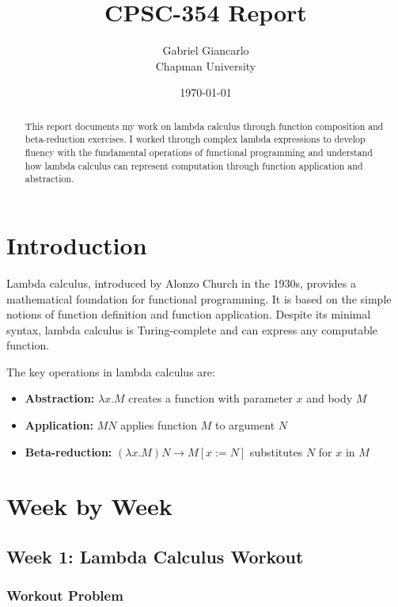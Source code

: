 \documentclass{article}
\title{CPSC-354 Report}
\author{Gabriel Giancarlo \\ Chapman University}
\date{\today}
\theoremstyle{plain}
\theoremstyle{definition}
\theoremstyle{remark}
\begin{document}
\maketitle

\begin{abstract}
This report documents my work on lambda calculus through function composition and beta-reduction exercises. I worked through complex lambda expressions to develop fluency with the fundamental operations of functional programming and understand how lambda calculus can represent computation through function application and abstraction.
\end{abstract}

\setcounter{tocdepth}{3}
\tableofcontents

\section{Introduction}\label{intro}

Lambda calculus, introduced by Alonzo Church in the 1930s, provides a mathematical foundation for functional programming. It is based on the simple notions of function definition and function application. Despite its minimal syntax, lambda calculus is Turing-complete and can express any computable function.

The key operations in lambda calculus are:
\begin{itemize}
\item \textbf{Abstraction:} $\lambda x.M$ creates a function with parameter $x$ and body $M$
\item \textbf{Application:} $M N$ applies function $M$ to argument $N$
\item \textbf{Beta-reduction:} $(\lambda x.M) N \to M[x := N]$ substitutes $N$ for $x$ in $M$
\end{itemize}

\section{Week by Week}\label{homework}

\subsection{Week 1: Lambda Calculus Workout}

\subsubsection{Workout Problem}
\end{document}
